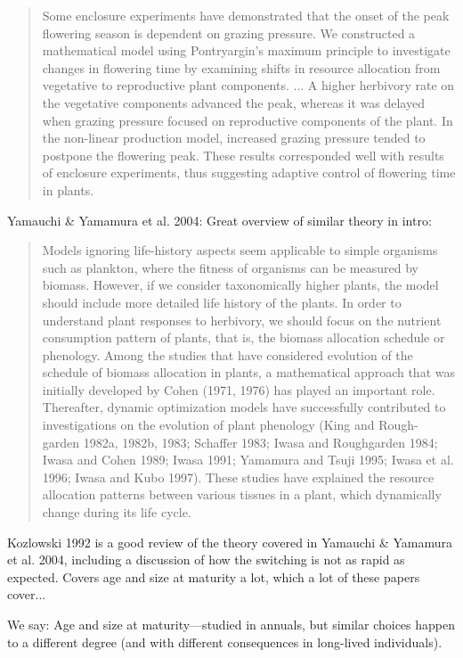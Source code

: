 \documentclass[11pt]{article}
\begin{document}
\begin{quote}
Some enclosure experiments have demonstrated that the onset of the peak flowering season is dependent on grazing pressure. We constructed a mathematical model using Pontryargin’s maximum principle to investigate changes in flowering time by examining shifts in resource allocation from vegetative to reproductive plant components. ... A higher herbivory rate on the vegetative components advanced the peak, whereas it was delayed when grazing pressure focused on reproductive components of the plant. In the non-linear production model, increased grazing pressure tended to postpone the flowering peak. These results corresponded well with results of enclosure experiments, thus suggesting adaptive control of flowering time in plants.
\end{quote}


Yamauchi \& Yamamura et al. 2004: Great overview of similar theory in intro:

\begin{quote}
Models ignoring life-history aspects seem applicable to simple organisms such as plankton, where the fitness of organisms can be measured by biomass. However, if we consider taxonomically higher plants, the model should include more detailed life history of the plants. In order to understand plant responses to herbivory, we should focus on the nutrient consumption pattern of plants, that is, the biomass allocation schedule or phenology. Among the studies that have considered evolution of the schedule of biomass allocation in plants, a mathematical approach that was initially developed by Cohen (1971, 1976) has played an important role. Thereafter, dynamic optimization models have successfully contributed to investigations on the evolution of plant phenology (King and Rough- garden 1982a, 1982b, 1983; Schaffer 1983; Iwasa and Roughgarden 1984; Iwasa and Cohen 1989; Iwasa 1991; Yamamura and Tsuji 1995; Iwasa et al. 1996; Iwasa and Kubo 1997). These studies have explained the resource allocation patterns between various tissues in a plant, which dynamically change during its life cycle.
\end{quote}

Kozlowski 1992 is a good review of the theory covered in Yamauchi \& Yamamura et al. 2004, including a discussion of how the switching is not as rapid as expected. Covers age and size at maturity a lot, which a lot of these papers cover... 

We say: Age and size at maturity---studied in annuals, but similar choices happen to a different degree (and with different consequences in long-lived individuals). 
\end{document}
